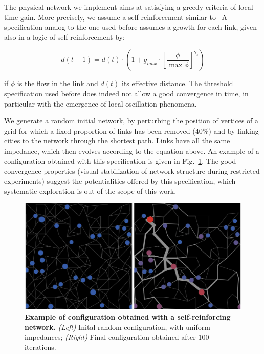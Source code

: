 

The physical network we implement aims at satisfying a greedy criteria of local time gain. More precisely, we assume a self-reinforcement similar to~\cite{tero2010rules} A specification analog to the one used before assumes a growth for each link, given also in a logic of self-reinforcement by:

\[
d(t+1) = d(t)\cdot \left(1 + g_{max} \cdot \left[\frac{\phi}{\max \phi}\right]^{\gamma_s}\right)
\]

if $\phi$ is the flow in the link and $d(t)$ its effective distance. The threshold specification used before does indeed not allow a good convergence in time, in particular with the emergence of local oscillation phenomena.

We generate a random initial network, by perturbing the position of vertices of a grid for which a fixed proportion of links has been removed (40\%) and by linking cities to the network through the shortest path. Links have all the same impedance, which then evolves according to the equation above. An example of a configuration obtained with this specification is given in Fig.~\ref{fig:macrocoevolution:slimemould}. The good convergence properties (visual stabilization of network structure during restricted experiments) suggest the potentialities offered by this specification, which systematic exploration is out of the scope of this work.


\begin{figure}
	\includegraphics[width=\linewidth]{figures/6-2-3-fig-macrocoevol-slimemould}
	\caption[Example of application of the macroscopic model with a self-reinforcing network]{\textbf{Example of configuration obtained with a self-reinforcing network.} \textit{(Left)} Inital random configuration, with uniform impedances; \textit{(Right)} Final configuration obtained after 100 iterations.\label{fig:macrocoevolution:slimemould}}
\end{figure}




